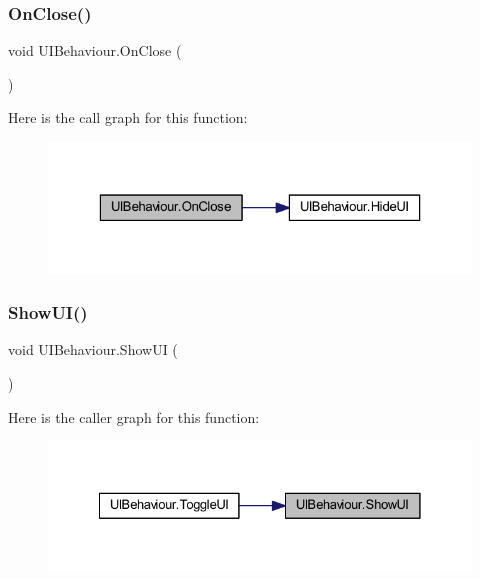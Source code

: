 \subsubsection{\texorpdfstring{OnClose()}{OnClose()}}
{\footnotesize\ttfamily void U\+I\+Behaviour.\+On\+Close (\begin{DoxyParamCaption}{ }\end{DoxyParamCaption})}

Here is the call graph for this function\+:
\nopagebreak
\begin{figure}[H]
\begin{center}
\leavevmode
\includegraphics[width=323pt]{class_u_i_behaviour_a058150104cbc5deee5bb2d2c8811380a_cgraph}
\end{center}
\end{figure}
\mbox{\label{class_u_i_behaviour_a14585d2d40b493d7999564d8a51d51c5}} 
\subsubsection{\texorpdfstring{ShowUI()}{ShowUI()}}
{\footnotesize\ttfamily void U\+I\+Behaviour.\+Show\+UI (\begin{DoxyParamCaption}{ }\end{DoxyParamCaption})}

Here is the caller graph for this function\+:
\nopagebreak
\begin{figure}[H]
\begin{center}
\leavevmode
\includegraphics[width=328pt]{class_u_i_behaviour_a14585d2d40b493d7999564d8a51d51c5_icgraph}
\end{center}
\end{figure}
\mbox{\label{class_u_i_behaviour_a508b07927b86c1f75ab1eeb45674f040}} 
